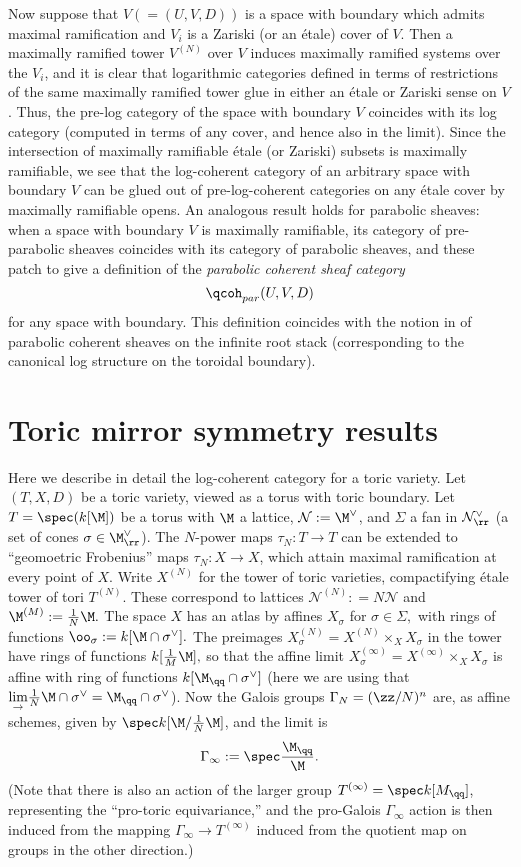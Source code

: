 \documentclass{article}
\newcommand{\N}{\mathcal{N}}
\newcommand{\dirlim}{\underset{\to}{\text{lim}}}
\begin{document}
Now suppose that $V ( = (U, V, D))$ is a space with boundary which admits maximal ramification and $V_i$ is a Zariski (or an \'etale) cover of $V$. Then a maximally ramified tower $V^{(N)}$ over $V$ induces maximally ramified systems over the $V_i$, and it is clear that logarithmic categories defined in terms of restrictions of the same maximally ramified tower glue in either an \'etale or Zariski sense on $V$. Thus, the pre-log category of the space with boundary $V$ coincides with its log category (computed in terms of any cover, and hence also in the limit). Since the intersection of maximally ramifiable \'etale (or Zariski) subsets is maximally ramifiable, we see that the log-coherent category of an arbitrary space with boundary $V$ can be glued out of pre-log-coherent categories on any \'etale cover by maximally ramifiable opens. An analogous result holds for parabolic sheaves: when a space with boundary $V$ is maximally ramifiable, its category of pre-parabolic sheaves coincides with its category of parabolic sheaves, and these patch to give a definition of the \emph{parabolic coherent sheaf category} $$\qcoh_{par}(U, V, D)$$ for any space with boundary. This definition coincides with the notion in \cite{talpo-vistoli} of parabolic coherent sheaves on the infinite root stack (corresponding to the canonical log structure on the toroidal boundary). 

\section{Toric mirror symmetry results}
Here we describe in detail the log-coherent category for a toric variety. Let $(T, X, D)$ be a toric variety, viewed as a torus with toric boundary. Let $T=\spec(k[\M])$ be a torus with $\M$ a lattice, $\N : = \M^\vee$, and $\Sigma$ a fan in $\N_\rr^\vee$ (a set of cones $\sigma\in \M_\rr^\vee$). The $N$-power maps $\tau_N:T\to T$ can be extended to ``geomoetric Frobenius'' maps $\tau_N:X\to X$, which attain maximal ramification at every point of $X$. Write $X^{(N)}$ for the tower of toric varieties, compactifying \'etale tower of tori $T^{(N)}$. These correspond to lattices $\N^{(N)} : = N\N$ and $\M^{(M)} : = \frac{1}{N}\M.$ The space $X$ has an atlas by affines $X_\sigma$ for $\sigma\in \Sigma,$ with rings of functions $\oo_\sigma : = k[\M\cap \sigma^\vee].$ The preimages $X_\sigma^{(N)} = X^{(N)}\times_X X_\sigma$ in the tower have rings of functions $k[\frac{1}{M}\M],$ so that the affine limit $X_\sigma^{(\infty)} = X^{(\infty)}\times_X X_\sigma$ is affine with ring of functions $k[\M_\qq\cap \sigma^\vee]$ (here we are using that $\dirlim \frac{1}{N}\M\cap \sigma^\vee = \M_\qq\cap \sigma^\vee$). Now the Galois groups $\Gamma_N = (\zz/N)^n$ are, as affine schemes, given by $\spec k[\M/\frac{1}{N}\M]$, and the limit is $$\Gamma_\infty : = \spec \frac{\M_\qq}{\M}.$$ (Note that there is also an action of the larger group $T^{(\infty)} = \spec k[M_\qq]$, representing the ``pro-toric equivariance,'' and the pro-Galois $\Gamma_\infty$ action is then induced from the mapping $\Gamma_\infty\to T^{(\infty)}$ induced from the quotient map on groups in the other direction.) 
\end{document}
